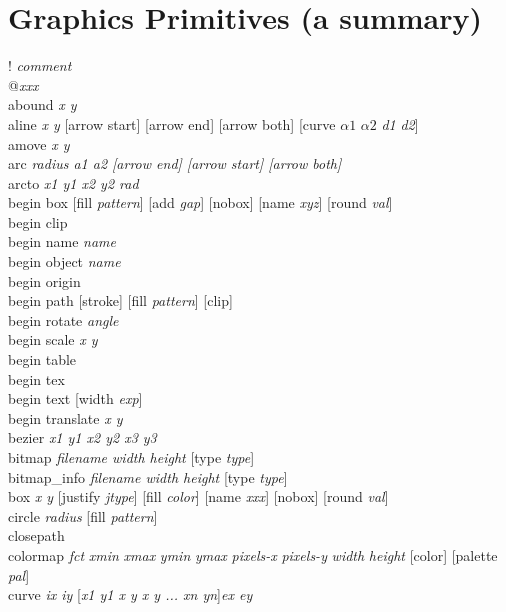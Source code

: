 \section{Graphics Primitives (a summary)}
{\sf ! {\it comment}} \\
{\sf @{\it xxx}} \\
{\sf abound {\it x y}} \\
{\sf aline {\it x y} [arrow start] [arrow end] [arrow both] [curve {\it $\alpha1$} {\it $\alpha2$} {\it d1} {\it d2}]} \\
{\sf amove {\it x y}}  \\
{\sf arc {\it radius a1 a2 [arrow end] [arrow start] [arrow both]}} \\
{\sf arcto {\it x1 y1 x2 y2 rad}}  \\
{\sf begin box [fill {\it pattern}] [add {\it gap}] [nobox] [name {\it xyz}] [round {\it val}]}  \\
{\sf begin clip }  \\
{\sf begin name {\it name}}  \\
{\sf begin object {\it name}}  \\
{\sf begin origin}  \\
{\sf begin path [stroke] [fill {\it pattern}] [clip]}  \\
{\sf begin rotate {\it angle}}  \\
{\sf begin scale {\it x y}}  \\
{\sf begin table }  \\
{\sf begin tex } \\
{\sf begin text [width {\it exp}] }    \\
{\sf begin translate {\it x y}}  \\
{\sf bezier {\it x1 y1 x2 y2 x3 y3}}  \\
{\sf bitmap {\it filename width height} [type {\it type}]} \\
{\sf bitmap\_info {\it filename width height} [type {\it type}]} \\
{\sf box {\it x y} [justify {\it jtype}] [fill {\it color}] [name {\it xxx}] [nobox] [round {\it val}]} \\
{\sf circle {\it radius} [fill {\it pattern}]}  \\
{\sf closepath }  \\
{\sf colormap {\it fct} {\it xmin} {\it xmax} {\it ymin} {\it ymax} {\it pixels-x} {\it pixels-y} {\it width} {\it height} [color] [palette {\it pal}]} \\
{\sf curve {\it ix iy }[{\it x1 y1 x y x y ... xn yn}]{\it ex ey }}  \\
